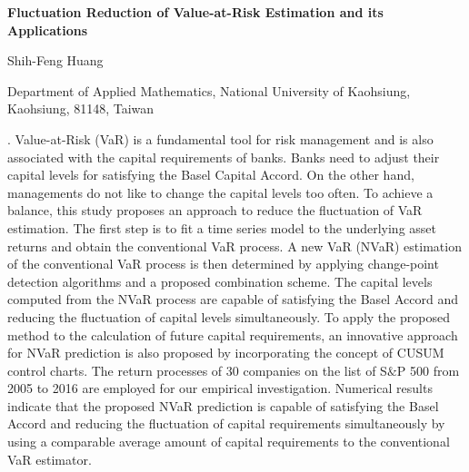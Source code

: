\documentclass[12pt]{article}
\begin{document}
\begin{flushleft}


{\LARGE\bf Fluctuation Reduction of Value-at-Risk Estimation and its Applications}


\vspace{1.0cm}

Shih-Feng Huang

\begin{description}
\item
Department of Applied Mathematics, National University of Kaohsiung,
Kaohsiung, 81148, Taiwan

\end{description}

\end{flushleft}


\vspace{0.75cm}

. 
 Value-at-Risk (VaR) is a fundamental tool for risk management and is also
 associated with the capital requirements of banks. Banks need to adjust their
 capital levels for satisfying the Basel Capital Accord. On the other hand,
 managements do not like to change the capital levels too often. To achieve
 a balance, this study proposes an approach to reduce the fluctuation of VaR
 estimation. The first step is to fit a time series model to the underlying asset returns
 and obtain the conventional VaR process. A new VaR (NVaR)
 estimation of the conventional VaR process is then determined by applying
 change-point detection algorithms and a proposed combination scheme. The
 capital levels computed from the NVaR process are capable of satisfying the
 Basel Accord and reducing the fluctuation of capital levels simultaneously. To
 apply the proposed method to the calculation of future capital requirements,
 an innovative approach for NVaR prediction is also proposed by incorporating
 the concept of CUSUM control charts. The return processes of 30 companies
 on the list of S$\&$P 500 from 2005 to 2016 are employed for our empirical investigation.
 Numerical results indicate that the proposed NVaR prediction is
 capable of satisfying the Basel Accord and reducing the fluctuation of capital
 requirements simultaneously by using a comparable average amount of capital
 requirements to the conventional VaR estimator.


\vskip 2mm
\end{document}
